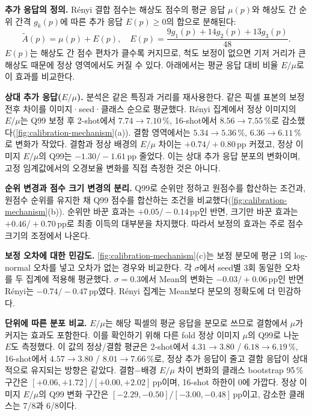 \noindent\textbf{추가 응답의 정의.}
Rényi 결합 점수는 해상도 점수의 평균 응답 $\mu(p)$와 해상도 간 순위 간격 $g_k(p)$에 따른 추가 응답 $E(p) \ge 0$의 합으로 분해된다:
\begin{equation}
  \tilde A(p) = \mu(p) + E(p), \quad E(p) = \frac{9g_1(p)+14g_2(p)+13g_3(p)}{48}.
  \label{eq:renyi-excess}
\end{equation}
$E(p)$는 해상도 간 점수 편차가 클수록 커지므로, 척도 보정이 없으면 기저 거리가 큰 해상도 때문에 정상 영역에서도 커질 수 있다. 아래에서는 평균 응답 대비 비율 $E/\mu$로 이 효과를 비교한다.

\noindent\textbf{상대 추가 응답($E/\mu$).}
분석은 같은 특징과 거리를 재사용한다. 같은 픽셀 표본의 보정 전후 차이를 이미지·seed·클래스 순으로 평균했다.
Rényi 집계에서 정상 이미지의 $E/\mu$는 Q99 보정 후 2-shot에서 $7.74\!\rightarrow\!7.10$\,\%, 16-shot에서 $8.56\!\rightarrow\!7.55$\,\%로 감소했다(\cref{fig:calibration-mechanism}(a)).
결함 영역에서는 $5.34\!\rightarrow\!5.36$\,\%, $6.36\!\rightarrow\!6.11$\,\%로 변화가 작았다.
결함과 정상 배경의 $E/\mu$ 차이는 $+0.74/+0.80$\,pp 커졌고, 정상 이미지 $E/\mu$의 Q99는 $-1.30/-1.61$\,pp 줄었다.
이는 상대 추가 응답 분포의 변화이며, 고정 임계값에서의 오경보율 변화를 직접 측정한 것은 아니다.

\noindent\textbf{순위 변경과 점수 크기 변경의 분리.}
Q99로 순위만 정하고 원점수를 합산하는 조건과, 원점수 순위를 유지한 채 Q99 점수를 합산하는 조건을 비교했다(\cref{fig:calibration-mechanism}(b)).
순위만 바꾼 효과는 $+0.05/-0.14$\,pp인 반면, 크기만 바꾼 효과는 $+0.46/+0.70$\,pp로 최종 이득의 대부분을 차지했다.
따라서 보정의 효과는 주로 점수 크기의 조정에서 나온다.

\noindent\textbf{보정 오차에 대한 민감도.}
\cref{fig:calibration-mechanism}(c)는 보정 분모에 평균 1의 log-normal 오차를 넣고 오차가 없는 경우와 비교한다. 각 $\sigma$에서 seed별 3회 동일한 오차를 두 집계에 적용해 평균했다.
$\sigma=0.3$에서 Mean의 \AUPRO 변화는 $-0.03/+0.06$\,pp인 반면 Rényi는 $-0.74/-0.47$\,pp였다.
Rényi 집계는 Mean보다 분모의 정확도에 더 민감하다.

\noindent\textbf{단위에 따른 분포 비교.}
$E/\mu$는 해당 픽셀의 평균 응답을 분모로 쓰므로 결함에서 $\mu$가 커지는 효과도 포함한다.
이를 확인하기 위해 다른 fold 정상 이미지 $\mu$의 Q99로 나눈 $E$도 측정했다.
이 값의 정상/결함 평균은 2-shot에서 $4.31\!\rightarrow\!3.80$ / $6.18\!\rightarrow\!6.19$\,\%, 16-shot에서 $4.57\!\rightarrow\!3.80$ / $8.01\!\rightarrow\!7.66$\,\%로, 정상 추가 응답이 줄고 결함 응답이 상대적으로 유지되는 방향은 같았다.
결함$-$배경 $E/\mu$ 차이 변화의 클래스 bootstrap 95\,\% 구간은 $[+0.06,+1.72]/[+0.00,+2.02]$\,pp이며, 16-shot 하한이 0에 가깝다.
정상 이미지 $E/\mu$의 Q99 변화 구간은 $[-2.29,-0.50]/[-3.00,-0.48]$\,pp이고, 감소한 클래스는 7/8과 6/8이다.

